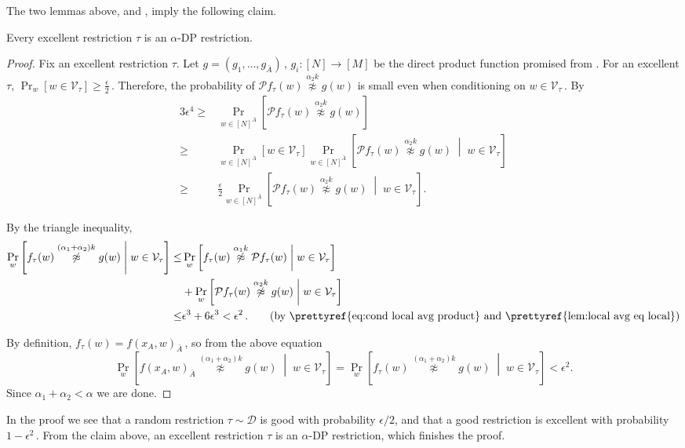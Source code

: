 \documentclass{toc}
\newcommand{\Prob}[2][]{\Pr_{{#1}}\left[#2\right]} %
\newcommand{\given}{\;\middle\vert\;} %
\newcommand\f{f} %
\newcommand{\g}{g} %
\newcommand\bh{\mathcal{P}\f_\tau} %
\newcommand\neqg[1]{\stackrel{{#1}}{ \not\approx}} %
\newcommand\cons{\mathcal{V}} %
\newcommand\rest[1]{{\bar{#1}}}  %
\begin{document}
%
The two lemmas above,  and , imply the following claim.
\begin{claim}
	Every excellent restriction $\tau$ is an $\alpha$-DP restriction. %
\end{claim} %
%
%
%
\begin{proof}
Fix an excellent restriction $\tau$. %
Let $\g = (\g_1,\ldots, \g_{\rest{A}})$\,, $\g_i:[N]\rightarrow[M]$ be the direct product function promised from .
	For an excellent $\tau$, $\Prob[w]{w\in\cons_\tau }\geq\frac{\epsilon}{2}$\,. Therefore, the probability of $\bh(w)\neqg{\alpha_2 k}\g(w)$ is small even when conditioning on $w\in\cons_{\tau}$\,. By 
	\begin{align}\label{eq:cond local avg product}
	3\epsilon^{4} \geq& \Prob[{w\in [N]^{\rest{A}}}]{\bh(w)\neqg{\alpha_2 k}\g(w) }  \nonumber \\
	\geq&  \Prob[{w\in [N]^{\rest{A}}}]{ w\in\cons_\tau } \Prob[{w\in [N]^{\rest{A}}}]{\bh(w)\neqg{\alpha_2 k}\g(w) \given w\in\cons_\tau }  \nonumber\\
	\geq& \frac{\epsilon}{2}\Prob[{w\in [N]^{\rest{A}}}]{\bh(w)\neqg{\alpha_2 k}\g(w) \given w\in\cons_\tau }.
	\end{align}

	By the triangle inequality,
	\begin{align*}
	\Prob[w]{f_\tau(w)\neqg{(\alpha_1 +\alpha_2)  k}\g(w)\given w\in\cons_{\tau}}\leq&
	\Prob[w]{f_\tau(w) \neqg{\alpha_1 k} \bh(w)\given w\in\cons_{\tau}}\\
	 &+  \Prob[w]{\bh(w)\neqg{\alpha_2 k}\g(w)\given w\in\cons_{\tau}} \\
	\leq& \epsilon^3 + 6\epsilon^3 < \epsilon^2 \,. %
	\tag{\text{by \prettyref{eq:cond local avg product} and \prettyref{lem:local avg eq local}}} %
	\end{align*}
	
	
	By definition, $f_\tau(w) = \f(x_A,w)_\rest{A}$\,, so from the above equation
	\[ \Prob[w]{\f(x_A,w)_{\rest{A}}\neqg{(\alpha_1+\alpha_2) k}\g(w)\given w\in\cons_{\tau}} =  \Prob[w]{f_\tau(w)\neqg{(\alpha_1+\alpha_2) k}\g(w)\given w\in\cons_{\tau}} < \epsilon^2. \]
	Since $\alpha_1+\alpha_2 < \alpha$ we are done.
\end{proof} %
In the proof we see that a random restriction $\tau\sim\mathcal{D}$ is good with probability $\epsilon/2$, and that a good restriction is excellent with probability $1-\epsilon^2$\,. From the claim above, an excellent restriction $\tau$ is an $\alpha$-DP restriction, which finishes the proof. %
\end{document}
